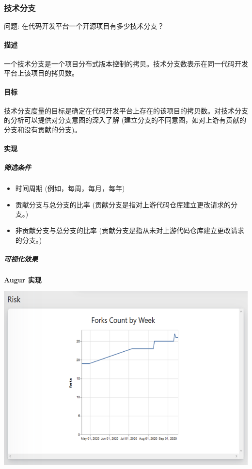 \hypertarget{ux6280ux672fux5206ux652f}{%
\subsubsection{技术分支}\label{ux6280ux672fux5206ux652f}}

问题: 在代码开发平台一个开源项目有多少技术分支？

\hypertarget{ux63cfux8ff0}{%
\paragraph{描述}\label{ux63cfux8ff0}}

一个技术分支是一个项目分布式版本控制的拷贝。技术分支数表示在同一代码开发平台上该项目的拷贝数。

\hypertarget{ux76eeux6807}{%
\paragraph{目标}\label{ux76eeux6807}}

技术分支度量的目标是确定在代码开发平台上存在的该项目的拷贝数。对技术分支的分析可以提供对分支意图的深入了解
(建立分支的不同意图，如对上游有贡献的分支和没有贡献的分支)。

\hypertarget{ux5b9eux73b0}{%
\paragraph{实现}\label{ux5b9eux73b0}}

\hypertarget{ux7b5bux9009ux6761ux4ef6}{%
\subparagraph{筛选条件}\label{ux7b5bux9009ux6761ux4ef6}}

\begin{itemize}
\tightlist
\item
  时间周期 (例如，每周，每月，每年)
\item
  贡献分支与总分支的比率
  (贡献分支是指对上游代码仓库建立更改请求的分支。)
\item
  非贡献分支与总分支的比率
  (贡献分支是指从未对上游代码仓库建立更改请求的分支。)
\end{itemize}

\hypertarget{ux53efux89c6ux5316ux6548ux679c}{%
\subparagraph{可视化效果}\label{ux53efux89c6ux5316ux6548ux679c}}

\textbf{Augur 实现}

\includegraphics{images/technical-fork_augur-fork.png}

